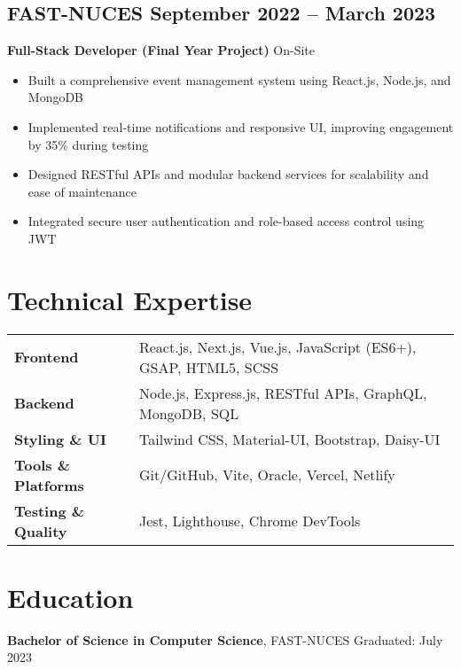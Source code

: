 \documentclass[11pt]{article}
\begin{document}
\subsection{\texorpdfstring{FAST-NUCES \hfill September 2022 -- March 2023}{FAST-NUCES, September 2022 -- March 2023}}  
\textbf{Full-Stack Developer (Final Year Project)} \hfill On-Site  
\begin{itemize}
\item Built a comprehensive event management system using React.js, Node.js, and MongoDB  
\item Implemented real-time notifications and responsive UI, improving engagement by 35\% during testing  
\item Designed RESTful APIs and modular backend services for scalability and ease of maintenance  
\item Integrated secure user authentication and role-based access control using JWT  
\end{itemize}

\section{Technical Expertise}
\begin{tabularx}{\textwidth}{@{} l X @{}}
\textbf{Frontend} & React.js, Next.js, Vue.js, JavaScript (ES6+), GSAP, HTML5, SCSS \\
\textbf{Backend} & Node.js, Express.js, RESTful APIs, GraphQL, MongoDB, SQL \\
\textbf{Styling \& UI} & Tailwind CSS, Material-UI, Bootstrap, Daisy-UI \\
\textbf{Tools \& Platforms} & Git/GitHub, Vite, Oracle, Vercel, Netlify \\
\textbf{Testing \& Quality} & Jest, Lighthouse, Chrome DevTools \\
\end{tabularx}

\section{Education}
\textbf{Bachelor of Science in Computer Science}, FAST-NUCES \hfill Graduated: July 2023 \\
\end{document}
